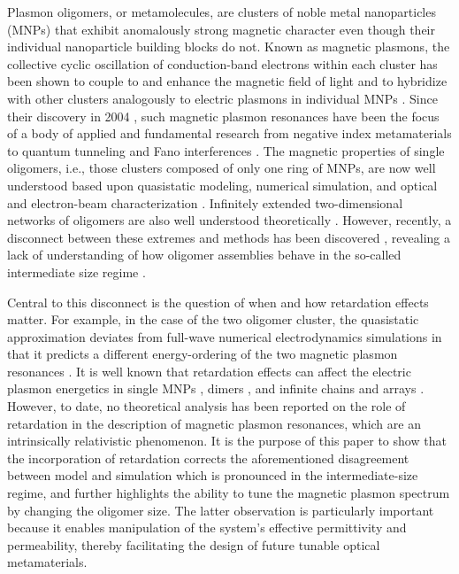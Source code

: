 \documentclass [11pt, proquest] {uwthesis}[2016/11/22]
\begin{document}
Plasmon oligomers, or metamolecules, are clusters of noble metal nanoparticles (MNPs) that exhibit anomalously strong magnetic character even though their individual nanoparticle building blocks do not. Known as magnetic plasmons, the collective cyclic oscillation of conduction-band electrons within each cluster has been shown to couple to and enhance the magnetic field of light and to hybridize with other clusters analogously to electric plasmons in individual MNPs \cite{Zhang2006,Zhang2007,NordHal2011,NordHal2012,Cherqui2014,Cherqui2016,Engheta2017}. Since their discovery in 2004 \cite{Shalaev2004}, such magnetic plasmon resonances have been the focus of a body of applied and fundamental research from negative index metamaterials\cite{Alu2006,Alu2008} to quantum tunneling \cite{Dionne2016} and Fano interferences \cite{Dionne2011,Liu2011,Cherqui2016}. The magnetic properties of single oligomers, i.e., those clusters composed of only one ring of MNPs, are now well understood based upon quasistatic modeling, numerical simulation, and optical and electron-beam characterization \cite{Prodan2003,Nord2006,Dionne2011,Dionne2016,Capolino2017}. Infinitely extended two-dimensional networks of oligomers are also well understood theoretically \cite{Schatz2003,Weick2013}. However, recently, a disconnect between these extremes and methods has been discovered \cite{Cherqui2014,Engheta2017}, revealing a lack of understanding of how oligomer assemblies behave in the so-called intermediate size regime \cite{NordHal2011,NordHal2012,Cherqui2014,Qian2015,Cherqui2016,Engheta2017,Fakhraai2018,Scherer2018}.




Central to this disconnect is the question of when and how retardation effects matter. For example, in the case of the two oligomer cluster, the quasistatic approximation deviates from full-wave numerical electrodynamics simulations in that it predicts a different energy-ordering of the two magnetic plasmon resonances \cite{Cherqui2014}. It is well known that retardation effects can affect the electric plasmon energetics in single MNPs \cite{Gu2010}, dimers \cite{Oubre2004,vonPlessen2007}, and infinite chains and arrays \cite{Lucas1976,ARAVIND1981,Kottman2001,Schatz2003,NordHal2003,NordProdan2004,Rechbacher2003,Schatz2003,Royer2005,Abajo2008,Gomez2009,Chumanov2010,Pinchuk2016}. However, to date, no theoretical analysis has been reported on the role of retardation in the description of magnetic plasmon resonances, which are an intrinsically relativistic phenomenon. It is the purpose of this paper to show that the incorporation of retardation corrects the aforementioned disagreement between model and simulation which is pronounced in the intermediate-size regime, and further highlights the ability to tune the magnetic plasmon spectrum by changing the oligomer size. The latter observation is particularly important because it enables manipulation of the system's effective permittivity and permeability, thereby facilitating the design of future tunable optical metamaterials.
\end{document}
